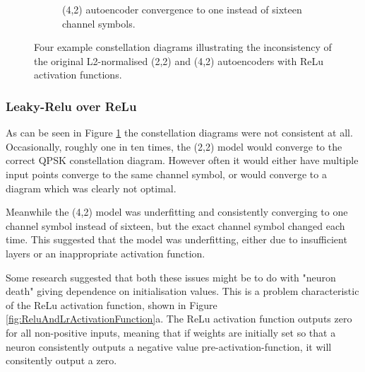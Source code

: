 \documentclass[12pt,onecolumn,letterpaper]{article}
\begin{document}
\begin{figure}[t!]
\begin{subfigure}[t]{0.2\textwidth}
       \caption{(4,2) autoencoder convergence to one instead of sixteen channel symbols.}
   \end{subfigure}
   \caption{Four example constellation diagrams illustrating the inconsistency of the original L2-normalised (2,2) and (4,2) autoencoders with ReLu activation functions.}
   \label{fig:InconsistentReluConstDiags}
\end{figure}

\subsubsection{Leaky-Relu over ReLu}

As can be seen in Figure \ref{fig:InconsistentReluConstDiags} the constellation diagrams were not consistent at all. Occasionally, roughly one in ten times, the (2,2) model would converge to the correct QPSK constellation diagram. However often it would either have multiple input points converge to the same channel symbol, or would converge to a diagram which was clearly not optimal.

Meanwhile the (4,2) model was underfitting and consistently converging to one channel symbol instead of sixteen, but the exact channel symbol changed each time. This suggested that the model was underfitting, either due to insufficient layers or an inappropriate activation function.

Some research suggested that both these issues might be to do with "neuron death" giving dependence on initialisation values. This is a problem characteristic of the ReLu activation function, shown in Figure \ref{fig:ReluAndLrActivationFunction}a. The ReLu activation function outputs zero for all non-positive inputs, meaning that if weights are initially set so that a neuron consistently outputs a negative value pre-activation-function, it will consitently output a zero.
\end{document}

